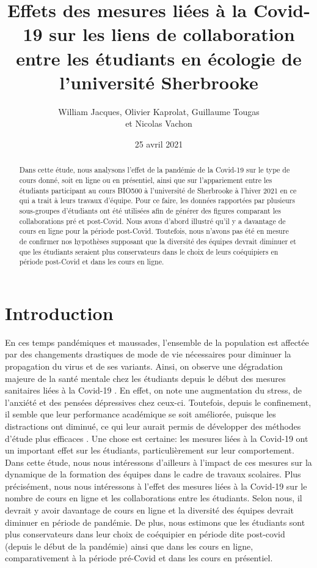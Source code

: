\documentclass{article}
\title{Effets des mesures liées à la Covid-19 sur les liens de collaboration entre les étudiants en écologie de l'université Sherbrooke}
\author{William Jacques, Olivier Kaprolat, Guillaume Tougas \\ et Nicolas Vachon}
\date{25 avril 2021}
\begin{document}
\maketitle

\begin{abstract}
Dans cette étude, nous analysons l'effet de la pandémie de la Covid-19 sur le type de cours donné, soit en ligne ou en présentiel, ainsi que sur l'appariement entre les étudiants participant au cours BIO500 à l'université de Sherbrooke à l'hiver 2021 en ce qui a trait à leurs travaux d'équipe. Pour ce faire, les données rapportées par plusieurs sous-groupes d'étudiants ont été utilisées afin de générer des figures comparant les collaborations pré et post-Covid. Nous avons d'abord illustré qu'il y a davantage de cours en ligne pour la période post-Covid. Toutefois, nous n'avons pas été en mesure de confirmer nos hypothèses supposant que la diversité des équipes devrait diminuer et que les étudiants seraient plus conservateurs dans le choix de leurs coéquipiers en période post-Covid et dans les cours en ligne.
\end{abstract}

\section{Introduction}
En ces temps pandémiques et maussades, l’ensemble de la population est affectée par des changements drastiques de mode de vie nécessaires pour diminuer la propagation du virus et de ses variants. Ainsi, on observe une dégradation majeure de la santé mentale chez les étudiants depuis le début des mesures sanitaires liées à la Covid-19 \cite{son_effects_2020}. En effet, on note une augmentation du stress, de l’anxiété et des pensées dépressives chez ceux-ci. Toutefois, depuis le confinement, il semble que leur performance académique se soit améliorée, puisque les distractions ont diminué, ce qui leur aurait permis de développer des méthodes d'étude plus efficaces \cite{gonzalez_influence_2020}. Une chose est certaine: les mesures liées à la Covid-19 ont un important effet sur les étudiants, particulièrement sur leur comportement. Dans cette étude, nous nous intéressons d’ailleurs à l’impact de ces mesures sur la dynamique de la formation des équipes dans le cadre de travaux scolaires. Plus précisément, nous nous intéressons à l’effet des mesures liées à la Covid-19 sur le nombre de cours en ligne et les collaborations entre les étudiants. Selon nous, il devrait y avoir davantage de cours en ligne et la diversité des équipes devrait diminuer en période de pandémie. De plus, nous estimons que les étudiants sont plus conservateurs dans leur choix de coéquipier en période dite post-covid (depuis le début de la pandémie) ainsi que dans les cours en ligne, comparativement à la période pré-Covid et dans les cours en présentiel. 
\clearpage
\end{document}
